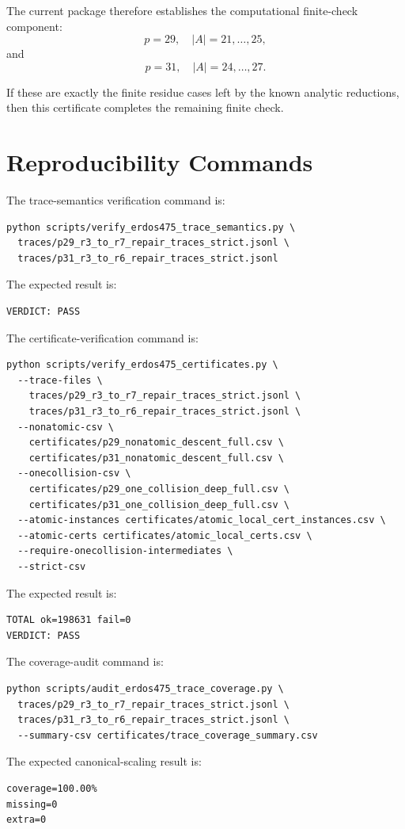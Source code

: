 \documentclass[11pt]{article}
\begin{document}
The current package therefore establishes the computational finite-check component:
\[
p=29,\quad |A|=21,\ldots,25,
\]
and
\[
p=31,\quad |A|=24,\ldots,27.
\]

If these are exactly the finite residue cases left by the known analytic reductions, then this certificate completes the remaining finite check.

\section{Reproducibility Commands}

The trace-semantics verification command is:
\begin{verbatim}
python scripts/verify_erdos475_trace_semantics.py \
  traces/p29_r3_to_r7_repair_traces_strict.jsonl \
  traces/p31_r3_to_r6_repair_traces_strict.jsonl
\end{verbatim}

The expected result is:
\begin{verbatim}
VERDICT: PASS
\end{verbatim}

The certificate-verification command is:
\begin{verbatim}
python scripts/verify_erdos475_certificates.py \
  --trace-files \
    traces/p29_r3_to_r7_repair_traces_strict.jsonl \
    traces/p31_r3_to_r6_repair_traces_strict.jsonl \
  --nonatomic-csv \
    certificates/p29_nonatomic_descent_full.csv \
    certificates/p31_nonatomic_descent_full.csv \
  --onecollision-csv \
    certificates/p29_one_collision_deep_full.csv \
    certificates/p31_one_collision_deep_full.csv \
  --atomic-instances certificates/atomic_local_cert_instances.csv \
  --atomic-certs certificates/atomic_local_certs.csv \
  --require-onecollision-intermediates \
  --strict-csv
\end{verbatim}

The expected result is:
\begin{verbatim}
TOTAL ok=198631 fail=0
VERDICT: PASS
\end{verbatim}

The coverage-audit command is:
\begin{verbatim}
python scripts/audit_erdos475_trace_coverage.py \
  traces/p29_r3_to_r7_repair_traces_strict.jsonl \
  traces/p31_r3_to_r6_repair_traces_strict.jsonl \
  --summary-csv certificates/trace_coverage_summary.csv
\end{verbatim}

The expected canonical-scaling result is:
\begin{verbatim}
coverage=100.00%
missing=0
extra=0
\end{verbatim}
\end{document}
